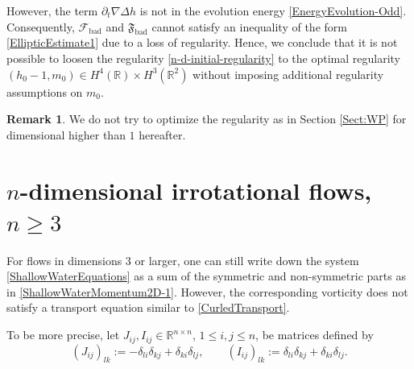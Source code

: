 \documentclass[reqno,11pt]{amsart}
\theoremstyle{plain}
\theoremstyle{definition}
\newtheorem{remark}[theorem]{Remark}
\numberwithin{equation}{section}
\begin{document}
However, the term $\partial_t \nabla\Delta h$ is not in the evolution energy \eqref{EnergyEvolution-Odd}. Consequently, $\mathcal{F}_{\text{bad}}$ and $\mathfrak{F}_{\text{bad}}$ cannot satisfy an inequality of the form \eqref{EllipticEstimate1} due to a loss of regularity. Hence, we conclude that it is not possible to loosen the regularity \eqref{n-d-initial-regularity} to the optimal regularity $(h_0-1,m_0)\in H^4(\mathbb{R})\times H^3(\mathbb{R}^2)$ without imposing additional regularity assumptions on $m_0$.
\begin{remark}
    We do not try to optimize the regularity as in Section \ref{Sect:WP} for dimensional higher than $ 1 $ hereafter.  
\end{remark}
\section{$ n $-dimensional irrotational flows, $ n \geq 3 $}
\label{sec:irrotational-flow}

For flows in dimensions $ 3 $ or larger, one can still write down the system \eqref{ShallowWaterEquations} as a sum of the symmetric and non-symmetric parts as in \eqref{ShallowWaterMomentum2D-1}. However, the corresponding vorticity does not satisfy a transport equation similar to \eqref{CurledTransport}. 

To be more precise,  let $ J_{ij}, I_{ij} \in \mathbb R^{n\times n} $, $ 1\leq i,j \leq n $, be matrices defined by
\begin{equation}
    \label{def:j-ij}
    (J_{ij})_{lk} := - \delta_{li}\delta_{kj} +  \delta_{ki}\delta_{lj},
    \qquad (I_{ij})_{lk} := \delta_{li}\delta_{kj} +  \delta_{ki}\delta_{lj}.
\end{equation}


\smallskip 
\end{document}
